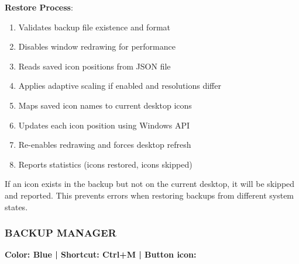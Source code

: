 \documentclass[a4paper,11pt]{article}
\begin{document}
\textbf{Restore Process}:
\begin{enumerate}
  \item Validates backup file existence and format
  \item Disables window redrawing for performance
  \item Reads saved icon positions from JSON file
  \item Applies adaptive scaling if enabled and resolutions differ
  \item Maps saved icon names to current desktop icons
  \item Updates each icon position using Windows API
  \item Re-enables redrawing and forces desktop refresh
  \item Reports statistics (icons restored, icons skipped)
\end{enumerate}

\begin{infobox}
  If an icon exists in the backup but not on the current desktop, it
  will be skipped and reported. This prevents errors when restoring
  backups from different system states.
\end{infobox}

\subsubsection{BACKUP MANAGER}

\textcolor{primary}{\textbf{Color: Blue | Shortcut: Ctrl+M | Button
icon: \faUndo}}
\end{document}
